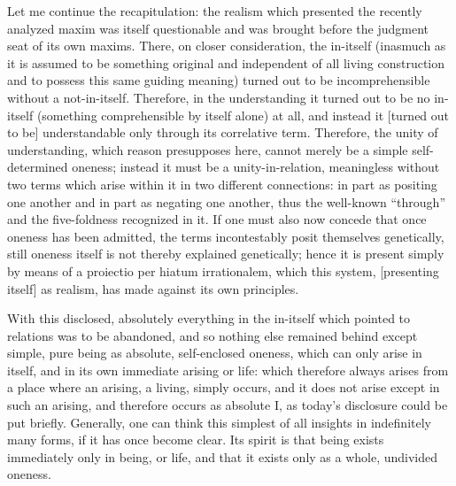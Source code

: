 Let me continue the recapitulation:
the realism which presented
the recently analyzed maxim was
itself questionable and was brought before
the judgment seat of its own maxims.
There, on closer consideration, the in-itself
(inasmuch as it is assumed to be something original
and independent of all living construction
and to possess this same guiding meaning)
turned out to be incomprehensible
without a not-in-itself.
Therefore, in the understanding
it turned out to be no in-itself
(something comprehensible by itself alone) at all,
and instead it [turned out to be] understandable
only through its correlative term.
Therefore, the unity of understanding,
which reason presupposes here,
cannot merely be a simple self-determined oneness;
instead it must be a unity-in-relation,
meaningless without two terms
which arise within it in two different connections:
in part as positing one another
and in part as negating one another,
thus the well-known “through” and
the five-foldness recognized in it.
If one must also now concede that
once oneness has been admitted,
the terms incontestably posit themselves genetically,
still oneness itself is not thereby explained genetically;
hence it is present simply by means of
a proiectio per hiatum irrationalem,
which this system, [presenting itself] as realism,
has made against its own principles.

With this disclosed, absolutely everything
in the in-itself which pointed to relations
was to be abandoned,
and so nothing else remained behind
except simple, pure being
as absolute, self-enclosed oneness,
which can only arise in itself,
and in its own immediate arising or life:
which therefore always arises
from a place where an arising,
a living, simply occurs, and
it does not arise except in such an arising,
and therefore occurs as absolute I,
as today's disclosure could be put briefly.
Generally, one can think this simplest
of all insights in indefinitely many forms,
if it has once become clear.
Its spirit is that being exists
immediately only in being, or life,
and that it exists only
as a whole, undivided oneness.
